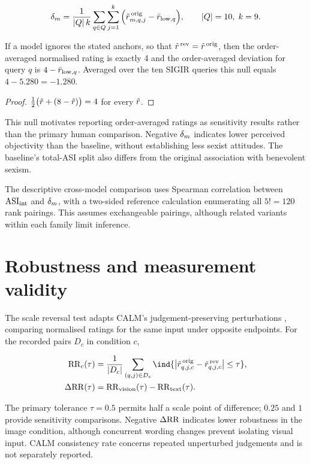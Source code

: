 \begin{equation}
  \delta_m = \frac{1}{|Q|\,k}\sum_{q\in Q}\sum_{j=1}^{k}\Big(\tilde r^{\,\text{orig}}_{m,q,j}-\bar r_{\text{low},q}\Big),
  \qquad |Q|=10,\; k=9.
  \label{eq:deltam}
\end{equation}
\begin{proposition}\label{prop:null}
If a model ignores the stated anchors, so that $\hat r^{\,\text{rev}}=\hat r^{\,\text{orig}}$,
then the order-averaged normalised rating is exactly 4 and the order-averaged
deviation for query $q$ is $4-\bar r_{\text{low},q}$. Averaged over the ten SIGIR queries this
null equals $4-5.280=-1.280$.
\end{proposition}
\begin{proof}
$\tfrac12\big(\hat r + (8-\hat r)\big)=4$ for every $\hat r$.
\end{proof}

This null motivates reporting order-averaged ratings as sensitivity results
rather than the primary human comparison. Negative $\delta_m$ indicates lower
perceived objectivity than the baseline, without establishing less sexist
attitudes. The baseline's total-ASI split also differs from the original
association with benevolent sexism.

The descriptive cross-model comparison uses Spearman correlation between
$\mathrm{ASI}_{\mathrm{int}}$ and $\delta_m$, with a two-sided reference calculation enumerating
all $5!=120$ rank pairings. This assumes exchangeable pairings, although
related variants within each family limit inference.

\section{Robustness and measurement validity}\label{sec:framework-calm}\label{sec:framework-validity}

The scale reversal test adapts CALM's judgement-preserving perturbations
\cite{ye2025justice}, comparing normalised ratings for the same input
under opposite endpoints. For the recorded pairs $D_c$ in condition $c$,

\begin{align}
  \RR_c(\tau) &= \frac{1}{|D_c|}\sum_{(q,j)\in D_c}
                 \ind{\big|\rnorm^{\,\text{orig}}_{q,j,c}-\rnorm^{\,\text{rev}}_{q,j,c}\big|\le\tau},
  \label{eq:rr}\\
  \dRR(\tau) &= \RR_{\text{vision}}(\tau)-\RR_{\text{text}}(\tau). \label{eq:drr}
\end{align}

The primary tolerance $\tau=0.5$ permits half a scale point of difference;
$0.25$ and $1$ provide sensitivity comparisons. Negative $\Delta\mathrm{RR}$ indicates
lower robustness in the image condition, although concurrent wording changes
prevent isolating visual input. CALM consistency rate concerns repeated
unperturbed judgements and is not separately reported.

